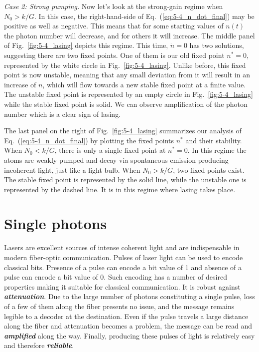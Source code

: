 \emph{Case 2: Strong pumping.}
Now let's look at the strong-gain regime when $N_0 > k / G$.
In this case, the right-hand-side of Eq.~(\ref{eq:5-4_n_dot_final}) may be positive as well as negative.
This means that for some starting values of $n(t)$ the photon number will decrease, and for others it will increase.
The middle panel of Fig.~\ref{fig:5-4_lasing} depicts this regime.
This time, $\dot{n} = 0$ has two solutions, suggesting there are two fixed points.
One of them is our old fixed point $n^*=0$, represented by the white circle in Fig.~\ref{fig:5-4_lasing}.
Unlike before, this fixed point is now unstable, meaning that any small deviation from it will result in an increase of $n$, which will flow towards a new stable fixed point at a finite value.
The unstable fixed point is represented by an empty circle in Fig.~\ref{fig:5-4_lasing} while the stable fixed point is solid.
We can observe amplification of the photon number which is a clear sign of lasing.

The last panel on the right of Fig.~\ref{fig:5-4_lasing} summarizes our analysis of Eq.~(\ref{eq:5-4_n_dot_final}) by plotting the fixed points $n^*$ and their stability.
When $N_0 < k / G$, there is only a single fixed point at $n^* = 0$.
In this regime the atoms are weakly pumped and decay via spontaneous emission producing incoherent light, just like a light bulb.
When $N_0 > k / G$, two fixed points exist.
The stable fixed point is represented by the solid line, while the unstable one is represented by the dashed line.
It is in this regime where lasing takes place.


\section{Single photons}
\label{sec:5-5_single_photons}

Lasers are excellent sources of intense coherent light and are indispensable in modern fiber-optic communication.
Pulses of laser light can be used to encode classical bits.
Presence of a pulse can encode a bit value of 1 and absence of a pulse can encode a bit value of 0.
Such encoding has a number of desired properties making it suitable for classical communication.
It is robust against \textbf{\emph{attenuation}}.
Due to the large number of photons constituting a single pulse, loss of a few of them along the fiber presents no issue, and the message remains legible to a decoder at the destination.
Even if the pulse travels a large distance along the fiber and attenuation becomes a problem, the message can be read and \textbf{\emph{amplified}} along the way.
Finally, producing these pulses of light is relatively easy and therefore \textbf{\emph{reliable}}.

